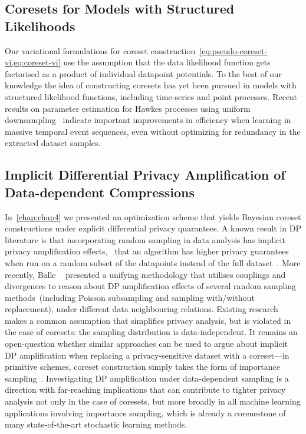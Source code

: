 \subsection{Coresets for Models with Structured Likelihoods}
\label{subsec:structure-liks}

Our variational formulations for coreset construction~\cref{eq:pseudo-coreset-vi,eq:coreset-vi} use the assumption that the data likelihood function gets factorised as a product of individual datapoint potentials. To the best of our knowledge the idea of constructing coresets has yet been pursued in models with structured likelihood functions, including time-series and point processes. Recent results on parameter estimation for Hawkes processes using uniform downsampling~\citep{li19} indicate important improvements in efficiency when learning in massive temporal event sequences, even without optimizing for redundancy in the extracted dataset samples.

\subsection{Implicit Differential Privacy Amplification of Data-dependent Compressions}
\label{subsec:implicit-dp-amplification}

In~\cref{chap:chap4} we presented an optimization scheme that yields Bayesian coreset constructions under explicit differential privacy quarantees. A known result in DP literature is that incorporating random sampling in data analysis has implicit privacy amplification effects, \ie~that an algorithm has higher privacy guarantees when run on a random subset of the datapoints instead of the full dataset~\citep{li12, beimel13, bassily14, abadi16}. More recently, Balle \etal~\citep{balle18} presented a unifying methodology that utilises couplings and divergences to reason about DP amplification effects of several random sampling methods~(including Poisson subsampling and sampling with/without replacement), under different data neighbouring relations. Existing research makes a common assumption that simplifies privacy analysis, but is violated in the case of coresets: the sampling distribution is data-independent. It remains an open-question whether similar approaches can be used to argue about implicit DP amplification when replacing a privacy-sensitive dataset with a coreset---in primitive schemes, coreset construction simply takes the form of importance sampling~\citep{bachem17}. Investigating DP amplification under data-dependent sampling is a direction with far-reaching implications that can contribute to tighter privacy analysis not only in the case of coresets, but more broadly in all machine learning applications involving importance sampling, which is already a corenestone of many state-of-the-art stochastic learning methods. 


